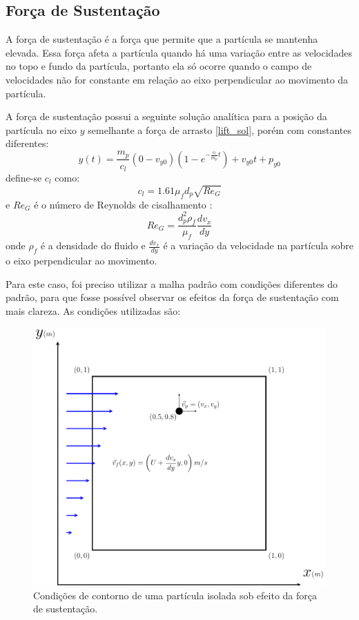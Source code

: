 \subsection{\textbf{Força de Sustentação}}
\label{sec_lift}
A força de sustentação é a força que permite que a partícula se mantenha elevada.
Essa força afeta a partícula quando há uma variação entre as velocidades no topo e fundo da partícula, portanto ela só ocorre quando o campo de velocidades não for constante em relação ao eixo perpendicular ao movimento da partícula.

A força de sustentação possui a seguinte solução analítica para a posição da partícula no eixo $y$ semelhante a força de arrasto \eqref{lift_sol}, porém com constantes diferentes:
\begin{equation}
    y(t) = \dfrac{m_p}{c_l} (0 - v_{y0}) \left(1 - e^{-\frac{c_l}{m_p}t}\right) + v_{y0}t + p_{y0}
    \label{lift_sol} 
\end{equation}
define-se $c_l$ como:
\begin{equation}
    c_l = 1.61 \mu_f d_p \sqrt{{Re}_G}
    \label{lift_c} 
\end{equation}
e $Re_G$ é o número de Reynolds de cisalhamento \cite{crowe}:
\begin{equation}
    Re_G = \dfrac{d_p^2 \rho_f}{\mu_f} \dfrac{dv_x}{dy}
    \label{lift_reg}
\end{equation}
onde $\rho_f$ é a densidade do fluido e $\tfrac{dv_x}{dy}$ é a variação da velocidade na partícula sobre o eixo perpendicular ao movimento.

Para este caso, foi preciso utilizar a malha padrão com condições diferentes do padrão, para que fosse possível observar os efeitos da força de sustentação com mais clareza.
As condições utilizadas são:
\begin{figure}[H]
    \centering
    \includegraphics[width=0.7\linewidth]{figures/lift_boundary_conditions.pdf}
    \caption{Condições de contorno de uma partícula isolada sob efeito da força de sustentação.}
    \label{lift_bc}
\end{figure}

